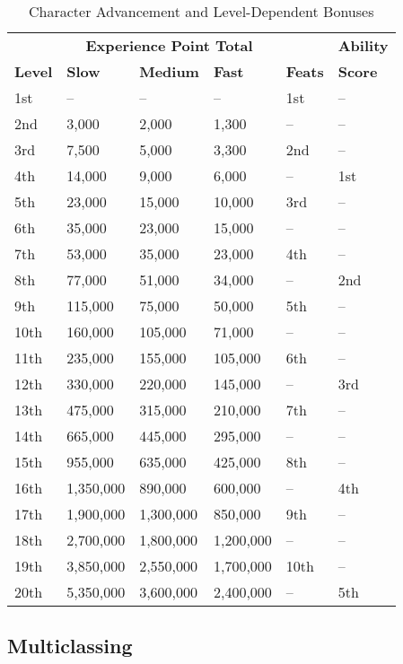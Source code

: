 \begin{table}[]
\sffamily
\caption{Character Advancement and Level-Dependent Bonuses}
\begin{tabular}{llllll}
      & \multicolumn{3}{c}{\textbf{Experience Point Total}} &       & \textbf{Ability}  \\
\textbf{Level} & \textbf{Slow} & \textbf{Medium} & \textbf{Fast} & \textbf{Feats} & \textbf{Score} \\
1st  & --         & --         & --         & 1st  & --   \\
2nd  & 3,000     & 2,000     & 1,300     & --    & --   \\
3rd  & 7,500     & 5,000     & 3,300     & 2nd  & --   \\
4th  & 14,000    & 9,000     & 6,000     & --    & 1st \\
5th  & 23,000    & 15,000    & 10,000    & 3rd  & --   \\
6th  & 35,000    & 23,000    & 15,000    & --    & --   \\
7th  & 53,000    & 35,000    & 23,000    & 4th  & --   \\
8th  & 77,000    & 51,000    & 34,000    & --    & 2nd \\
9th  & 115,000   & 75,000    & 50,000    & 5th  & --   \\
10th & 160,000   & 105,000   & 71,000    & --    & --   \\
11th & 235,000   & 155,000   & 105,000   & 6th  & --   \\
12th & 330,000   & 220,000   & 145,000   & --    & 3rd \\
13th & 475,000   & 315,000   & 210,000   & 7th  & --   \\
14th & 665,000   & 445,000   & 295,000   & --    & --   \\
15th & 955,000   & 635,000   & 425,000   & 8th  & --   \\
16th & 1,350,000 & 890,000   & 600,000   & --    & 4th \\
17th & 1,900,000 & 1,300,000 & 850,000   & 9th  & --   \\
18th & 2,700,000 & 1,800,000 & 1,200,000 & --    & --   \\
19th & 3,850,000 & 2,550,000 & 1,700,000 & 10th & --   \\
20th & 5,350,000 & 3,600,000 & 2,400,000 & --    & 5th
\end{tabular}
\end{table}

				
\subsection{Multiclassing}

